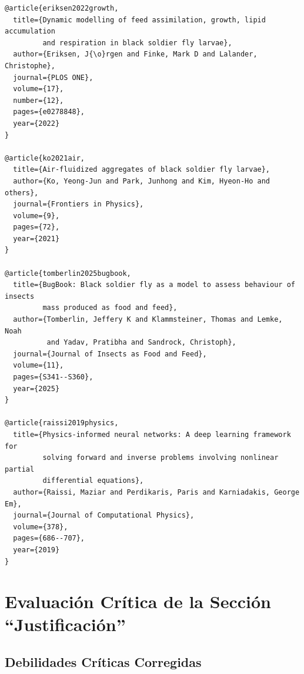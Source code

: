 \documentclass[12pt,oneside]{book}
\begin{document}
\begin{verbatim}
@article{eriksen2022growth,
  title={Dynamic modelling of feed assimilation, growth, lipid accumulation 
         and respiration in black soldier fly larvae},
  author={Eriksen, J{\o}rgen and Finke, Mark D and Lalander, Christophe},
  journal={PLOS ONE},
  volume={17},
  number={12},
  pages={e0278848},
  year={2022}
}

@article{ko2021air,
  title={Air-fluidized aggregates of black soldier fly larvae},
  author={Ko, Yeong-Jun and Park, Junhong and Kim, Hyeon-Ho and others},
  journal={Frontiers in Physics},
  volume={9},
  pages={72},
  year={2021}
}

@article{tomberlin2025bugbook,
  title={BugBook: Black soldier fly as a model to assess behaviour of insects 
         mass produced as food and feed},
  author={Tomberlin, Jeffery K and Klammsteiner, Thomas and Lemke, Noah 
          and Yadav, Pratibha and Sandrock, Christoph},
  journal={Journal of Insects as Food and Feed},
  volume={11},
  pages={S341--S360},
  year={2025}
}

@article{raissi2019physics,
  title={Physics-informed neural networks: A deep learning framework for 
         solving forward and inverse problems involving nonlinear partial 
         differential equations},
  author={Raissi, Maziar and Perdikaris, Paris and Karniadakis, George Em},
  journal={Journal of Computational Physics},
  volume={378},
  pages={686--707},
  year={2019}
}
\end{verbatim}

\chapter{Evaluación Crítica de la Sección ``Justificación''}

\section{Debilidades Críticas Corregidas}
\end{document}
